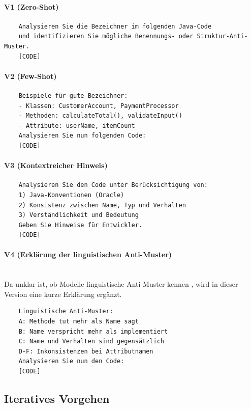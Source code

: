\documentclass[a4paper,12pt]{article}
\begin{document}
\paragraph{V1 (Zero-Shot)}
\begin{verbatim}
    Analysieren Sie die Bezeichner im folgenden Java-Code
    und identifizieren Sie mögliche Benennungs- oder Struktur-Anti-Muster.
    [CODE]
\end{verbatim}

\paragraph{V2 (Few-Shot)}
\begin{verbatim}
    Beispiele für gute Bezeichner:
    - Klassen: CustomerAccount, PaymentProcessor
    - Methoden: calculateTotal(), validateInput()
    - Attribute: userName, itemCount
    Analysieren Sie nun folgenden Code:
    [CODE]
\end{verbatim}

\paragraph{V3 (Kontextreicher Hinweis)}
\begin{verbatim}
    Analysieren Sie den Code unter Berücksichtigung von:
    1) Java-Konventionen (Oracle)
    2) Konsistenz zwischen Name, Typ und Verhalten
    3) Verständlichkeit und Bedeutung
    Geben Sie Hinweise für Entwickler.
    [CODE]
\end{verbatim}

\paragraph{V4 (Erklärung der linguistischen Anti-Muster)}
\mbox{}\\
Da unklar ist, ob Modelle linguistische Anti-Muster kennen \cite{arnaoudova2014}, wird in dieser Version eine kurze Erklärung ergänzt.

\begin{verbatim}
    Linguistische Anti-Muster:
    A: Methode tut mehr als Name sagt
    B: Name verspricht mehr als implementiert
    C: Name und Verhalten sind gegensätzlich
    D-F: Inkonsistenzen bei Attributnamen
    Analysieren Sie nun den Code:
    [CODE]
\end{verbatim}

\subsection{Iteratives Vorgehen}
\end{document}
